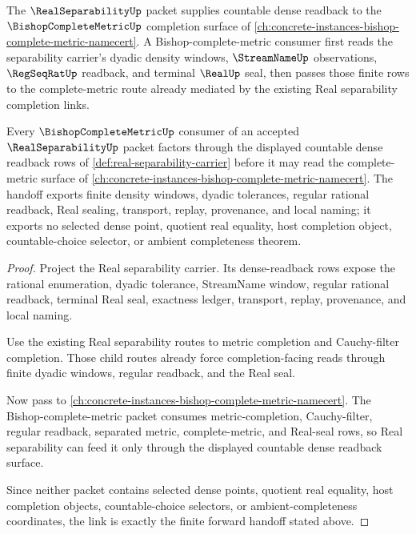 The $\RealSeparabilityUp$ packet supplies countable dense readback to the $\BishopCompleteMetricUp$ completion surface of \autoref{ch:concrete-instances-bishop-complete-metric-namecert}. A Bishop-complete-metric consumer first reads the separability carrier's dyadic density windows, $\StreamNameUp$ observations, $\RegSeqRatUp$ readback, and terminal $\RealUp$ seal, then passes those finite rows to the complete-metric route already mediated by the existing Real separability completion links.

\begin{theorem}
\label{thm:real-separability-bishop-complete-metric-forward-link}
Every $\BishopCompleteMetricUp$ consumer of an accepted $\RealSeparabilityUp$ packet factors through the displayed countable dense readback rows of \autoref{def:real-separability-carrier} before it may read the complete-metric surface of \autoref{ch:concrete-instances-bishop-complete-metric-namecert}. The handoff exports finite density windows, dyadic tolerances, regular rational readback, Real sealing, transport, replay, provenance, and local naming; it exports no selected dense point, quotient real equality, host completion object, countable-choice selector, or ambient completeness theorem.
\end{theorem}
\begin{proof}
Project the Real separability carrier. Its dense-readback rows expose the rational enumeration, dyadic tolerance, StreamName window, regular rational readback, terminal Real seal, exactness ledger, transport, replay, provenance, and local naming.

Use the existing Real separability routes to metric completion and Cauchy-filter completion. Those child routes already force completion-facing reads through finite dyadic windows, regular readback, and the Real seal.

Now pass to \autoref{ch:concrete-instances-bishop-complete-metric-namecert}. The Bishop-complete-metric packet consumes metric-completion, Cauchy-filter, regular readback, separated metric, complete-metric, and Real-seal rows, so Real separability can feed it only through the displayed countable dense readback surface.

Since neither packet contains selected dense points, quotient real equality, host completion objects, countable-choice selectors, or ambient-completeness coordinates, the link is exactly the finite forward handoff stated above.
\end{proof}
